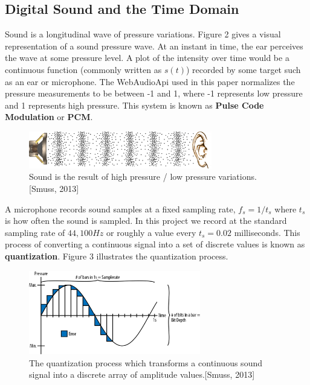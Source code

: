\documentclass[DIV=calc, paper=a4, fontsize=11pt, twocolumn]{scrartcl}   %
\begin{document}
\subsection{Digital Sound and the Time Domain}
Sound is a longitudinal wave of pressure variations. Figure 2 gives a visual representation of a sound pressure wave. At an instant in time, the ear perceives the wave at some pressure level. A plot of the intensity over time would be a continuous function (commonly written as $s(t)$) recorded by some target such as an ear or microphone. The WebAudioApi used in this paper normalizes the pressure measurements to be between -1 and 1, where -1 represents low pressure and 1 represents high pressure. This system is known as \textbf{Pulse Code Modulation} or \textbf{PCM}.

\begin{figure}[h]
\centering
\includegraphics[width=80mm]{figures/pressure_wave.png}
\caption{Sound is the result of high pressure / low pressure variations. [Smuss, 2013]}
\label{overflow}
\end{figure}

\par A microphone records sound samples at a fixed sampling rate, $ f_s = 1/t_s $ where $t_s$ is how often the sound is sampled. In this project we record at the standard sampling rate of
 $44,100Hz$ or roughly a value every $t_s =0.02$ milliseconds. This process of converting a continuous signal into a set of discrete values is known as \textbf{quantization}. Figure 3 illustrates the quantization process.

 \begin{figure}[h]
\centering
\includegraphics[width=75mm]{figures/quantization.png}
\caption{The quantization process which transforms a continuous sound signal into a discrete array of amplitude values.[Smuss, 2013]}
\label{overflow}
\end{figure}
\end{document}

